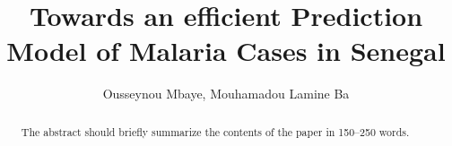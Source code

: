 \documentclass[runningheads]{llncs}
\begin{document}
%
\title{Towards an efficient Prediction Model of Malaria Cases in Senegal}
%
%
\author{Ousseynou Mbaye, Mouhamadou Lamine Ba}
%
%
%
\maketitle              %
%
\begin{abstract}
The abstract should briefly summarize the contents of the paper in
150--250 words.

\end{abstract}
%
%












%
%
%
% 
% 
%
\end{document}
